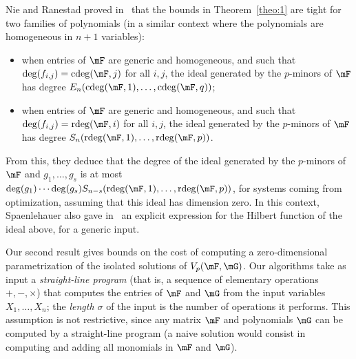 \documentclass[12pt]{article}
\begin{document}
Nie and Ranestad proved in~\cite{NieRan09} that the bounds in
Theorem~\ref{theo:1} are tight for two families of polynomials
(in a similar context where the polynomials are homogeneous in
$n+1$ variables):
\begin{itemize}
\item when entries of $\mF$ are generic and homogeneous, and
 such that $\deg(f_{i,j}) = \cdeg(\mF,j)$ for all $i,j$, the ideal
 generated by the $p$-minors of $\mF$ has degree $E_{n}(\cdeg(\mF,1), \ldots, \cdeg(\mF,q))$;
\item when entries of $\mF$ are  generic and homogeneous, and
  such that $\deg(f_{i,j}) = \rdeg(\mF,i)$ for all $i,j$, the
  ideal generated by the $p$-minors of $\mF$
 has degree $S_{n}(\rdeg(\mF,1), \ldots, \rdeg(\mF,p))$.
\end{itemize}
From this, they deduce that the degree of the ideal generated by the
$p$-minors of $\mF$ and $ g_1,\dots,g_s $ is at most \sloppy
$\deg(g_1) \cdots \deg(g_s) S_{n-s}(\rdeg(\mF,1), \ldots,
\rdeg(\mF,p))$, for systems coming from optimization, assuming that
this ideal has dimension zero. In this context, Spaenlehauer also gave
in~\cite{Spa14} an explicit expression for the Hilbert function of the
ideal above, for a generic input.

\medskip

Our second result gives bounds on the cost of computing a
zero-dimensional parametrization of the isolated solutions of
$\VpFG{p}{\mF}{\mG}$. Our
algorithms take as input a \emph{straight-line program} (that is, a
sequence of elementary operations $+, -, \times$) that computes the
entries of $\mF$ and $\mG$ from the input variables $X_1,\dots,X_n$; the
\emph{length $\sigma$} of the input is the number of operations it
performs. This assumption is not restrictive, since any matrix $\mF$
and polynomials $\mG$ can be computed by a straight-line program (a
naive solution would consist in computing and adding all monomials in
$\mF$ and $\mG$).
\end{document}
